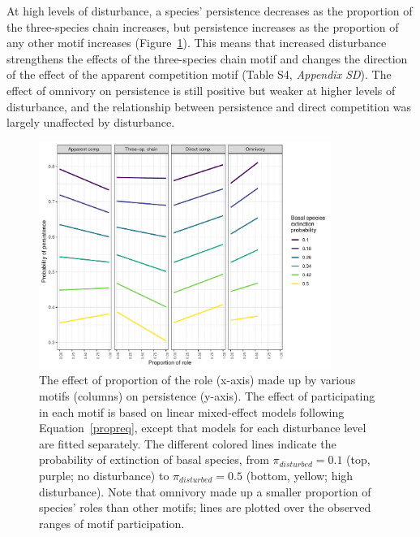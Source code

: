 \documentclass[12pt]{article}
\begin{document}
\begin{spacing}{2.0}
        At high levels of disturbance, a species' persistence decreases as the proportion of the three-species chain increases, but persistence increases as the proportion of any other motif increases (Figure~\ref{fig:prop_lmer_all}). This means that increased disturbance strengthens the effects of the three-species chain motif and changes the direction of the effect of the apparent competition motif  (Table S4, \emph{Appendix SD}). The effect of omnivory on persistence is still positive but weaker at higher levels of disturbance, and the relationship between persistence and direct competition was largely unaffected by disturbance.
    
            
            \begin{figure}[h!]
                \centering
                \includegraphics[width=0.85\textwidth]{figures/prop_lmer_allCS.pdf}
                \caption{The effect of proportion of the role (x-axis) made up by various motifs (columns) on persistence (y-axis). The effect of participating in each motif is based on linear mixed-effect models following Equation~\ref{propreq}, except that models for each  disturbance level are fitted separately. The different colored lines indicate the probability of extinction of basal species, from $\pi_{disturbed} = 0.1$ (top, purple; no disturbance) to $\pi_{disturbed} = 0.5$ (bottom, yellow; high disturbance). Note that omnivory made up a smaller proportion of species' roles than other motifs; lines are plotted over the observed ranges of motif participation.}
                \label{fig:prop_lmer_all}
            \end{figure}
        
        \clearpage
    

\end{spacing}
\end{document}
